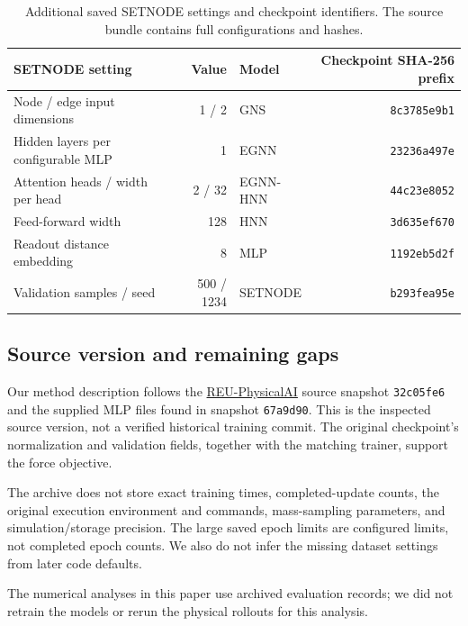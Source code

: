 \documentclass[10pt,letterpaper,twocolumn]{article}
\numberwithin{equation}{section}
\begin{document}
\begin{table}[htbp]
\centering\small
\caption{Additional saved SETNODE settings and checkpoint identifiers. The source bundle contains
full configurations and hashes.}
\label{tab:archive}
\setlength{\tabcolsep}{7pt}
\begin{tabular}{lr@{\qquad}lr}
\toprule
SETNODE setting & Value & Model & Checkpoint SHA-256 prefix\\
\midrule
Node / edge input dimensions & 1 / 2 & GNS & \texttt{8c3785e9b1}\\
Hidden layers per configurable MLP & 1 & EGNN & \texttt{23236a497e}\\
Attention heads / width per head & 2 / 32 & EGNN-HNN & \texttt{44c23e8052}\\
Feed-forward width & 128 & HNN & \texttt{3d635ef670}\\
Readout distance embedding & 8 & MLP & \texttt{1192eb5d2f}\\
Validation samples / seed & 500 / 1234 & SETNODE & \texttt{b293fea95e}\\
\bottomrule
\end{tabular}
\end{table}

\subsection{Source version and remaining gaps}

Our method description follows the \href{https://github.com/Branshi/REU-PhysicalAI}{REU-PhysicalAI}
source snapshot \texttt{32c05fe6} and the supplied MLP files found in snapshot \texttt{67a9d90}. This is the inspected source version,
not a verified historical training commit. The original checkpoint's normalization and validation
fields, together with the matching trainer, support the force objective.

The archive does not store exact training times, completed-update counts, the original execution
environment and commands, mass-sampling parameters,
and simulation/storage precision.  The large saved epoch limits are configured limits, not completed
epoch counts. We also do not infer the missing dataset settings from later code defaults.

The numerical analyses in this paper use archived evaluation records; we did not retrain the
models or rerun the physical rollouts for this analysis.
\end{document}
